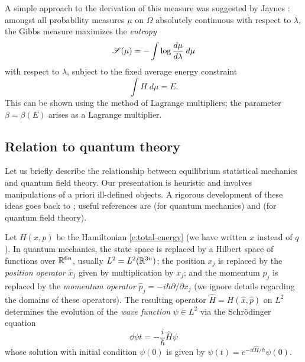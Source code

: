 A simple approach to the derivation of this measure was suggested by Jaynes \cite{Jaynes57}:
amongst all probability measures $\mu$ on $\Omega$ absolutely
continuous with respect to $\lambda$, the Gibbs measure maximizes the \emph{entropy}
\begin{equation}
\label{e:entropy-def}
\mathscr{S}(\mu) = -\int \log \frac{d\mu}{d\lambda} \; d\mu
\end{equation}
with respect to $\lambda$, subject to the fixed average energy constraint
\begin{equation}
\label{e:fix-avg-energy}
\int H \; d\mu = E.
\end{equation}
This can be shown using the method of Lagrange multipliers;
the parameter $\beta = \beta(E)$ arises as a Lagrange multiplier.


\subsection{Relation to quantum theory}
\label{sec:quantum}

Let us briefly describe the relationship between equilibrium statistical
mechanics and quantum field theory. Our presentation is heuristic and involves
manipulations of a priori ill-defined objects. A rigorous development of these
ideas goes back to \cite{Syma69,Nelson73,OS73,OS75}; useful references are
\cite{Simon05} (for quantum mechanics) and \cite{GJ87} (for quantum
field theory).

Let $H(x, p)$ be the Hamiltonian \eqref{e:total-energy} (we have written $x$
instead of $q$). In quantum mechanics, the state space is replaced by a Hilbert
space of functions over ${\mathbb R}^{6n}$, usually $L^2 = L^2({\mathbb R}^{3n})$;
the position $x_j$ is replaced by the \emph{position operator} $\hat x_j$ given by
multiplication by $x_j$; and the momentum $p_j$ is replaced by the \emph{momentum
operator} $\hat p_j = -i \hbar \partial/\partial x_j$ (we ignore details regarding
the domains of these operators). The resulting operator $\hat H = H(\hat x, \hat p)$
on $L^2$ determines the evolution of the \emph{wave function} $\psi\in L^2$ via
the Schr\"{o}dinger equation
\begin{equation}
\dd{\psi}{t} = -\frac{i}{\hbar} \hat H \psi
\end{equation}
whose solution with initial condition $\psi(0)$ is given by
$\psi(t) = e^{-it\hat H/\hbar} \psi(0)$.

